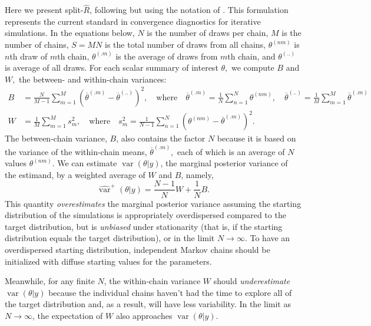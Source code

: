 \documentclass[american,]{article}
\DeclareMathOperator{\var}{var}
\theoremstyle{definition}
\begin{document}
Here we present split-\(\widehat{R}\),
following \citet{BDA3} but using the notation of
\citet{StanManual.2.18.0}. This formulation represents the current 
standard in convergence diagnostics for iterative simulations. In the
equations below, \(N\) is the number of draws per chain, \(M\) is the
number of chains, \(S=MN\) is the total number of draws from all
chains, \(\theta^{(nm)}\) is $n$th draw of $m$th chain,
\(\theta^{(.m)}\) is the average of draws from $m$th chain, and
\(\theta^{(..)}\) is average of all draws. For each scalar summary of
interest \(\theta,\) we compute \(B\) and \(W,\) the between- and
within-chain variances:
\begin{align}
B &= \frac{N}{M-1}\sum_{m=1}^{M}(\overline{\theta}^{(.m)} - 
\overline{\theta}^{(..)})^2, \quad \mbox{where} \quad 
\overline{\theta}^{(.m)}=\frac{1}{N}\sum_{n=1}^N \theta^{(nm)}, \quad
\overline{\theta}^{(..)} = \frac{1}{M}\sum_{m=1}^M\overline{\theta}^{(.m)} 
\\
W &= \frac{1}{M}\sum_{m=1}^{M}s_m^2, \quad \mbox{where} \quad
s_m^2=\frac{1}{N-1} \sum_{n=1}^N (\theta^{(nm)}-\overline{\theta}^{(.m)})^2.
\end{align}
The between-chain variance, \(B\), also contains the factor \(N\)
because it is based on the variance of the within-chain means,
\(\overline{\theta}^{(.m)},\) each of which is an average of \(N\)
values \(\theta^{(nm)}\). We can estimate \(\var(\theta | y)\),
the marginal posterior variance of the estimand, by a weighted average
of \(W\) and \(B\), namely,
\begin{equation}
\widehat{\var}^+(\theta| y) = \frac{N-1}{N}W + \frac{1}{N}B.
\end{equation}
This quantity \emph{overestimates} the marginal posterior variance
assuming the starting distribution of the simulations is appropriately
overdispersed compared to the target distribution, but is
\emph{unbiased} under stationarity (that is, if the starting
distribution equals the target distribution), or in the limit
\(N\rightarrow\infty\). To have an overdispersed starting distribution,
independent Markov chains should be initialized with diffuse starting
values for the parameters. 

Meanwhile, for any finite \(N\), the within-chain variance \(W\) should
\emph{underestimate} \(\var(\theta |y)\) because the
individual chains haven't had the time to explore all of the target
distribution and, as a result, will have less variability. In the limit
as \(N\rightarrow\infty\), the expectation of \(W\) also approaches
\(\var(\theta |y)\).
\end{document}

